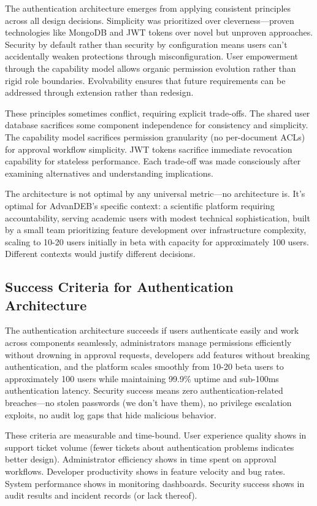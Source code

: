 \documentclass[12pt,a4paper]{article}
\begin{document}
The authentication architecture emerges from applying consistent principles across all design decisions. Simplicity was prioritized over cleverness—proven technologies like MongoDB and JWT tokens over novel but unproven approaches. Security by default rather than security by configuration means users can't accidentally weaken protections through misconfiguration. User empowerment through the capability model allows organic permission evolution rather than rigid role boundaries. Evolvability ensures that future requirements can be addressed through extension rather than redesign.

These principles sometimes conflict, requiring explicit trade-offs. The shared user database sacrifices some component independence for consistency and simplicity. The capability model sacrifices permission granularity (no per-document ACLs) for approval workflow simplicity. JWT tokens sacrifice immediate revocation capability for stateless performance. Each trade-off was made consciously after examining alternatives and understanding implications.

The architecture is not optimal by any universal metric—no architecture is. It's optimal for AdvanDEB's specific context: a scientific platform requiring accountability, serving academic users with modest technical sophistication, built by a small team prioritizing feature development over infrastructure complexity, scaling to 10-20 users initially in beta with capacity for approximately 100 users. Different contexts would justify different decisions.

\subsection{Success Criteria for Authentication Architecture}

The authentication architecture succeeds if users authenticate easily and work across components seamlessly, administrators manage permissions efficiently without drowning in approval requests, developers add features without breaking authentication, and the platform scales smoothly from 10-20 beta users to approximately 100 users while maintaining 99.9\% uptime and sub-100ms authentication latency. Security success means zero authentication-related breaches—no stolen passwords (we don't have them), no privilege escalation exploits, no audit log gaps that hide malicious behavior.

These criteria are measurable and time-bound. User experience quality shows in support ticket volume (fewer tickets about authentication problems indicates better design). Administrator efficiency shows in time spent on approval workflows. Developer productivity shows in feature velocity and bug rates. System performance shows in monitoring dashboards. Security success shows in audit results and incident records (or lack thereof).
\end{document}
